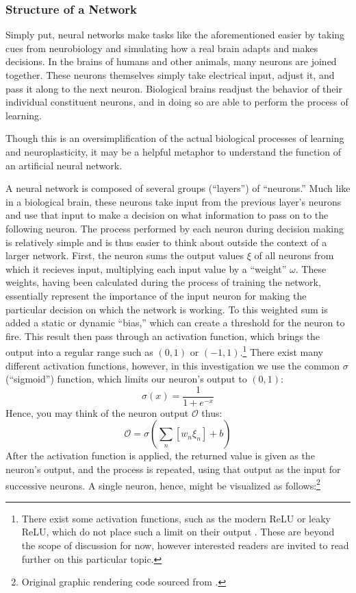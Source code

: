 \documentclass{article}
\begin{document}
\subsubsection{Structure of a Network}
Simply put, neural networks make tasks like the aforementioned easier by taking cues from neurobiology and simulating how a real brain adapts and makes decisions. In the brains of humans and other animals, many neurons are joined together. These neurons themselves simply take electrical input, adjust it, and pass it along to the next neuron. Biological brains readjust the behavior of their individual constituent neurons, and in doing so are able to perform the process of learning.

Though this is an oversimplification of the actual biological processes of learning and neuroplasticity, it may be a helpful metaphor to understand the function of an artificial neural network.

A neural network is composed of several groups (``layers'') of ``neurons.'' Much like in a biological brain, these neurons take input from the previous layer's neurons and use that input to make a decision on what information to pass on to the following neuron. The process performed by each neuron during decision making is relatively simple and is thus easier to think about outside the context of a larger network. First, the neuron sums the output values $\xi$ of all neurons from which it recieves input, multiplying each input value by a ``weight'' $\omega$. These weights, having been calculated during the process of training the network, essentially represent the importance of the input neuron for making the particular decision on which the network is working. To this weighted sum is added a static or dynamic ``bias,'' which can create a threshold for the neuron to fire. This result then pass through an activation function, which brings the output into a regular range such as $(0, 1)$ or $(-1, 1)$.\footnote{There exist some activation functions, such as the modern ReLU or leaky ReLU, which do not place such a limit on their output \cite{activationfunctions}. These are beyond the scope of discussion for now, however interested readers are invited to read further on this particular topic.} There exist many different activation functions, however, in this investigation we use the common $\sigma$ (``sigmoid'') function, which limits our neuron's output to $(0, 1)$:
$$\sigma(x)=\frac{1}{1+e^{-x}}$$
Hence, you may think of the neuron output $\mathcal{O}$ thus:
$$\mathcal{O}=\sigma(\sum_n[w_{n}\xi_{n}]+b)$$
After the activation function is applied, the returned value is given as the neuron's output, and the process is repeated, using that output as the input for successive neurons. A single neuron, hence, might be visualized as follows:\footnote{Original graphic rendering code sourced from \cite{neurondiagrams}.}
\end{document}
